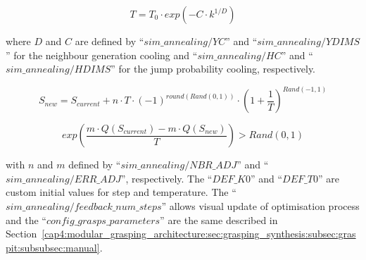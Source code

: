 \begin{equation}
	T=T_{0} \cdot exp{ (-C \cdot k^{1/D})}
	\label{eq:implemented_temp}
\end{equation}

\noindent
where $D$ and $C$ are defined by ``$sim\_annealing/YC$'' and ``$sim\_annealing/YDIMS$'' for the neighbour generation cooling and ``$sim\_annealing/HC$'' and ``$sim\_annealing/HDIMS$'' for the jump probability cooling, respectively. 


\begin{equation}
	S_{new}=S_{current}+ n \cdot T \cdot(-1)^{round(Rand(0,1))} \cdot\left(1+\frac{1}{T}\right)^{Rand(-1,1)}
	\label{eq:implemented_neighbors}
\end{equation}

\begin{equation}
	exp({\frac{m \cdot Q(S_{current})-m \cdot Q(S_{new})}{T}})>Rand(0,1)
	\label{eq:implemented_very_fast_snn_prob}
\end{equation}
  
\noindent 
with $n$ and $m$ defined by ``$sim\_annealing/NBR\_ADJ$'' and ``$sim\_annealing/ERR\_ADJ$'', respectively. The ``$DEF\_K0$'' and ``$DEF\_T0$''  are custom initial values for step and temperature. The ``$sim\_annealing/feedback\_num\_steps$'' allows visual update of optimisation process and the ``$config\_grasps\_parameters$'' are the same described in Section~\ref{cap4:modular_grasping_architecture:sec:grasping_synthesis:subsec:graspit:subsubsec:manual}.

